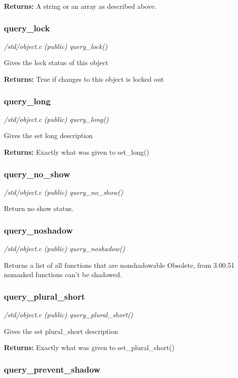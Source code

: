 {\bf Returns:}        A string or an array as described above.


\subsubsection{query\_lock}

{\em /std/object.c (public) query\_lock()}

Gives the lock status of this object

{\bf Returns:}        True if changes to this object is locked out


\subsubsection{query\_long}

{\em /std/object.c (public) query\_long()}

Gives the set long description

{\bf Returns:}        Exactly what was given to set\_long()


\subsubsection{query\_no\_show}

{\em /std/object.c (public) query\_no\_show()}

Return no show status.


\subsubsection{query\_noshadow}

{\em /std/object.c (public) query\_noshadow()}

Returns a list of all functions that are nonshadowable
Obsolete, from 3.00.51 nomasked functions can't be
shadowed.


\subsubsection{query\_plural\_short}

{\em /std/object.c (public) query\_plural\_short()}

Gives the set plural\_short description

{\bf Returns:}        Exactly what was given to set\_plural\_short()


\subsubsection{query\_prevent\_shadow}

